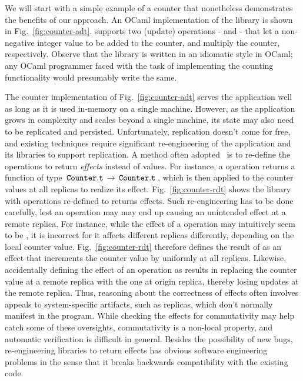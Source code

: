 We will start with a simple example of a counter that nonetheless
demonstrates the benefits of our approach. An OCaml implementation of
the  library is shown in Fig.~\ref{fig:counter-adt}.
 supports two (update) operations -  and  -
that let a non-negative integer value to be added to the counter, and
multiply the counter, respectively. Observe that the library is
written in an idiomatic style in OCaml; any OCaml programmer faced
with the task of implementing the counting functionality would
presumably write the same.  

The counter implementation of Fig.~\ref{fig:counter-adt} serves the
application well as long as it is used in-memory on a single machine.
However, as the application grows in complexity and scales beyond a
single machine, its state may also need to be replicated and
persisted. Unfortunately, replication doesn't come for free, and
existing techniques require significant re-engineering of the
application and its libraries to support replication. A method often
adopted~\cite{crdts,gotsman-popl16} is to re-define the operations to
return \emph{effects} instead of values.  For instance, a 
operation returns a function of type $\,{\tt Counter.t}\, \rightarrow
\,{\tt Counter.t}\,$, which is then applied to the counter values at all
replicas to realize its effect.  Fig.~\ref{fig:counter-rdt} shows the
 library with operations re-defined to returns effects.
Such re-engineering has to be done carefully, lest an operation may
may end up causing an unintended effect at a remote replica. For
instance, while the effect of a  operation may intuitively
seem to be , it is incorrect for it affects
different replicas differently, depending on the local counter value.
Fig.~\ref{fig:counter-rdt} therefore defines the result of  as an effect that increments the counter value by  uniformly at all replicas. Likewise, accidentally defining the
effect of an  operation as 
results in replacing the counter value at a remote replica with the
one at origin replica, thereby losing updates at the remote replica.
Thus, reasoning about the correctness of effects often involves
appeals to system-specific artifacts, such as replicas, which don't
normally manifest in the program.  While checking the effects for
commutativity may help catch some of these oversights, commutativity
is a non-local property, and automatic verification is difficult in
general. Besides the possibility of new bugs, re-engineering libraries
to return effects has obvious software engineering problems in the
sense that it breaks backwards compatibility with the existing code.

